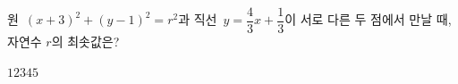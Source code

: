 원~$(x+3)^2+(y-1)^2=r^2$과 직선~$y=\dfrac{4}{3}x+\dfrac{1}{3}$이 서로 다른 두 점에서 만날 때, 자연수 $r$의 최솟값은?
\begin{choices32}{$1$}{$2$}{$3$}{$4$}{$5$}\end{choices32}
